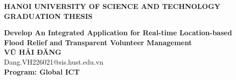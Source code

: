 \documentclass[Main.tex]{subfiles}
\begin{document}
\begin{titlepage}
\thispagestyle{empty}
\begin{center}

{\textbf{\large{HANOI UNIVERSITY OF SCIENCE AND TECHNOLOGY }}}\\[4cm]

{\textbf{\huge{GRADUATION THESIS}}}\\[1cm]
{\textbf{\Large{Develop An Integrated Application for Real-time Location-based Flood Relief and Transparent Volunteer Management}}\\[1cm]

{\textbf{\large{VŨ HẢI ĐĂNG}}}\\
{\large{Dang.VH226021@sis.hust.edu.vn}}\\[0.5cm]

{\textbf{\large{Program: Global ICT}}}\\

\vspace{4cm}
\begin{table}[H]
\centering
{}
\end{table}}
\end{center}



\end{titlepage}
\end{document}
